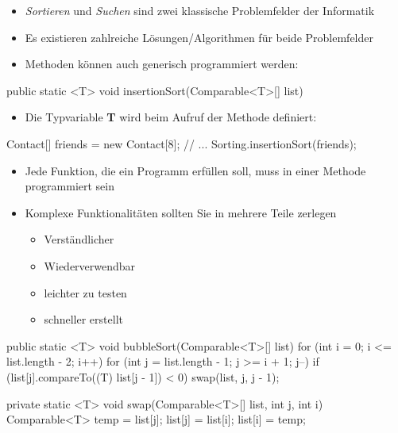 \documentclass[a4paper,10pt, dvipsnames]{report}
\begin{document}
\begin{itemize}
    \item \textit{Sortieren} und \textit{Suchen} sind zwei klassische Problemfelder der Informatik
    \item Es existieren zahlreiche Lösungen/Algorithmen für beide Problemfelder
\end{itemize}


\begin{itemize}
    \item Methoden können auch generisch programmiert werden:
\end{itemize}

\begin{javacodebox}
public static <T> void insertionSort(Comparable<T>[] list) {
}
\end{javacodebox}

\begin{itemize}
    \item Die Typvariable \textbf{T} wird beim Aufruf der Methode definiert:
\end{itemize}

\begin{javacodebox}
Contact[] friends = new Contact[8];
// ...
Sorting.insertionSort(friends);
\end{javacodebox}

\begin{itemize}
    \item Jede Funktion, die ein Programm erfüllen soll, muss in einer Methode programmiert sein
    \item Komplexe Funktionalitäten sollten Sie in mehrere Teile zerlegen
    \begin{itemize}
        \item Verständlicher
        \item Wiederverwendbar
        \item leichter zu testen
        \item schneller erstellt
    \end{itemize}
\end{itemize}

\begin{javacodebox}
public static <T> void bubbleSort(Comparable<T>[] list) {
    for (int i = 0; i <= list.length - 2; i++)
        for (int j = list.length - 1; j >= i + 1; j--)
            if (list[j].compareTo((T) list[j - 1]) < 0)
                swap(list, j, j - 1);
}

private static <T> void swap(Comparable<T>[] list, int j, int i) {
    Comparable<T> temp = list[j];
    list[j] = list[i];
    list[i] = temp;
}
\end{javacodebox}
\end{document}
